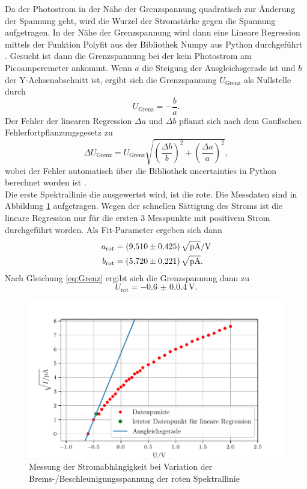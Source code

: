 \noindent Da der Photostrom in der Nähe der Grenzspannung quadratisch zur Änderung der Spannung geht, wird die Wurzel 
der Stromstärke gegen die Spannung aufgetragen. In der Nähe der Grenzspannung wird dann eine Lineare Regression mittels der Funktion
Polyfit aus der Bibliothek Numpy aus Python durchgeführt \cite{numpy}. Gesucht ist dann die Grenzspannung bei der kein Photostrom am 
Picoamperemeter ankommt. Wenn $a$ die Steigung der Ausgleichsgerade ist und $b$ der Y-Achsenabschnitt ist, ergibt sich die Grenzspannung $U_\text{Grenz}$ als Nullstelle durch 
\begin{equation}
  U_\text{Grenz}=-\frac{b}{a}.
  \label{eq:Grenz}
\end{equation}
Der Fehler der linearen Regression $\Delta a$ und $\Delta b$ pflanzt sich nach dem Gaußschen Fehlerfortpflanzungsgesetz
zu 
\begin{equation*}
  \Delta U_\text{Grenz}= U_\text{Grenz}\sqrt{\left(\frac{\Delta b}{b}\right)^2+\left(\frac{\Delta a}{a}\right)^2},
\end{equation*}
wobei der Fehler automatisch über die Bibliothek uncertainties in Python berechnet worden ist \cite{uncertainties}.
\\
\noindent Die erste Spektrallinie die ausgewertet wird, ist die rote. Die Messdaten sind in Abbildung \ref{fig:rot} aufgetragen.
Wegen der schnellen Sättigung des Stroms ist die lineare Regression nur für die ersten 3 Messpunkte mit positivem Strom durchgeführt worden.
Als Fit-Parameter ergeben sich dann
\begin{align*}
  a_\text{rot}&=\qty{9.51(0.425)}{\sqrt{\pico\ampere}\per\volt}\\
  b_\text{rot}&=\qty{5.72(0.221)}{\sqrt{\pico\ampere}}.\\
\end{align*}
Nach Gleichung \eqref{eq:Grenz} ergibt sich die Grenzspannung dann zu
\begin{equation*}
  U_\text{rot}=\qty{-0.6(0.04)}{\volt}.
\end{equation*}
\begin{figure}[H]
  \centering
  \includegraphics{content/rot.pdf}
  \caption{Messung der Stromabhängigkeit bei Variation der Brems-/Beschleunigungsspannung der roten Spektrallinie}
  \label{fig:rot}
\end{figure}

